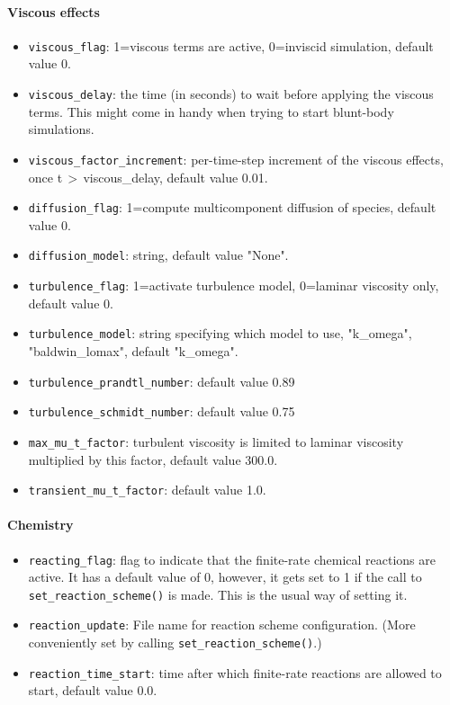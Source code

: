 \paragraph{Viscous effects}
\begin{itemize}
\item \texttt{viscous\_flag}: 1=viscous terms are active, 0=inviscid
  simulation, default value 0.
\item \texttt{viscous\_delay}: the time (in seconds) to wait before applying
  the viscous terms.
  This might come in handy when trying to start blunt-body simulations.
\item \texttt{viscous\_factor\_increment}: per-time-step increment of the viscous effects, once
  t\,$>$\,viscous\_delay, default value 0.01.
\item \texttt{diffusion\_flag}: 1=compute multicomponent diffusion of species, default value 0.
\item \texttt{diffusion\_model}: string, default value "None".
\item \texttt{turbulence\_flag}: 1=activate turbulence model, 0=laminar viscosity only,
  default value 0.
\item \texttt{turbulence\_model}: string specifying which model to use, "k\_omega", "baldwin\_lomax",
  default "k\_omega".
\item \texttt{turbulence\_prandtl\_number}: default value 0.89
\item \texttt{turbulence\_schmidt\_number}: default value 0.75
\item \texttt{max\_mu\_t\_factor}: turbulent viscosity is limited to laminar viscosity multiplied
  by this factor, default value 300.0. 
\item \texttt{transient\_mu\_t\_factor}: default value 1.0.
\end{itemize}

\paragraph{Chemistry}
\begin{itemize}
\item \texttt{reacting\_flag}: flag to indicate that the finite-rate chemical
  reactions are active.
  It has a default value of 0, however, it gets set to 1 if the call 
  to \texttt{set\_reaction\_scheme()} is made.
  This is the usual way of setting it.
\item \texttt{reaction\_update}: File name for reaction scheme configuration.
  (More conveniently set by calling \texttt{set\_reaction\_scheme()}.)
\item \texttt{reaction\_time\_start}: time after which finite-rate reactions are allowed to start,
  default value 0.0.
\end{itemize}

